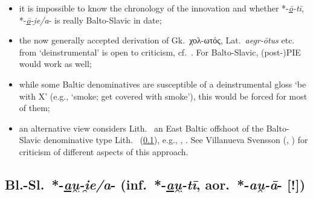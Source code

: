 \documentclass[output=paper,colorlinks,citecolor=brown]{langscibook}
\begin{document}
\begin{itemize}
    \item it is impossible to know the chronology of the innovation and whether *-\textit{\underline{ō}-tī}, *-\textit{\underline{ō}-i̯e/a}- is really Balto-Slavic in date;
    \item the now generally accepted derivation of Gk.\ χολ-ωτός, Lat.\ \textit{aegr-ōtus} etc. from ‘deinstrumental’  is open to criticism, cf.\ \citet[82--90]{Fortson2020}. For Balto-Slavic, (post-)PIE  would work as well;
    \item while some Baltic denominatives are susceptible of a deinstrumental gloss ‘be with X’ (e.g.,  ‘smoke; get covered with smoke’), this would be forced for most of them;
    \item an alternative view considers Lith.\  an East Baltic offshoot of the Balto-Slavic denominative type Lith.\  (\ref{sec:BSlauje}), e.g., \citet[352--353]{Vaillant1966}, \citet{Kortlandt1995}. See Villanueva Svensson (\citeyear{VillanuevaSvensson2014auti}, \citeyear{VillanuevaSvensson2015}) for criticism of different aspects of this approach.
\end{itemize}

\subsection{Bl.-Sl.\ *-\textit{\underline{au̯}-i̯e/a}- (inf.\ *-\textit{\underline{au̯}-tī}, aor.\ *-\textit{au̯-ā}- [!])}
\label{sec:BSlauje}
\end{document}
